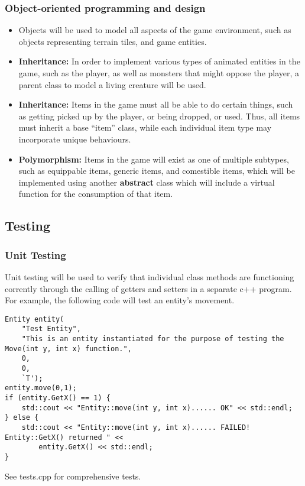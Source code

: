 \documentclass{article}
\begin{document}
\subsubsection{Object-oriented programming and design}
\begin{itemize}
    \item Objects will be used to model all aspects of the game environment, such as objects representing terrain tiles, and game entities.
    \item \textbf{Inheritance:} In order to implement various types of animated entities in the game, such as the player, as well as monsters that might oppose the player, a parent class to model a living creature will be used.
    \item \textbf{Inheritance:} Items in the game must all be able to do certain things, such as getting picked up by the player, or being dropped, or used. Thus, all items must inherit a base ``item'' class, while each individual item type may incorporate unique behaviours.
    \item \textbf{Polymorphism:} Items in the game will exist as one of multiple subtypes, such as equippable items, generic items, and comestible items, which will be implemented using another \textbf{abstract} class which will include a virtual function for the consumption of that item.
\end{itemize}
\subsection{Testing}
\subsubsection{Unit Testing}
Unit testing will be used to verify that individual class methods are functioning corrently through the calling of getters and setters in a separate c++ program. For example, the following code will test an entity's movement.
\begin{verbatim}
Entity entity(
    "Test Entity",
    "This is an entity instantiated for the purpose of testing the Move(int y, int x) function.",
    0,
    0,
    `T');
entity.move(0,1);
if (entity.GetX() == 1) {
    std::cout << "Entity::move(int y, int x)...... OK" << std::endl;
} else {
    std::cout << "Entity::move(int y, int x)...... FAILED! Entity::GetX() returned " <<
        entity.GetX() << std::endl;
}
\end{verbatim}

See tests.cpp for comprehensive tests.
\end{document}
